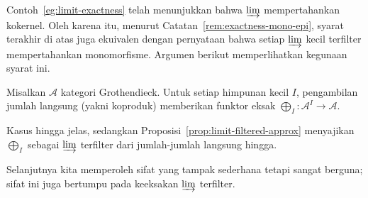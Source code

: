 Contoh~\ref{eg:limit-exactness} telah menunjukkan bahwa $\varinjlim$
mempertahankan kokernel. Oleh karena itu, menurut
Catatan~\ref{rem:exactness-mono-epi}, syarat terakhir di atas juga ekuivalen
dengan pernyataan bahwa setiap $\varinjlim$ kecil terfilter mempertahankan
monomorfisme. Argumen berikut memperlihatkan kegunaan syarat ini.

\begin{proposisi}\label{prop:Grothendieck-cat-coprod-exact}
Misalkan $\mathcal{A}$ kategori Grothendieck. Untuk setiap himpunan kecil $I$,
pengambilan jumlah langsung (yakni koproduk) memberikan funktor eksak
$\bigoplus_I:\mathcal{A}^I\to\mathcal{A}$.
\end{proposisi}
\begin{bukti}
Kasus hingga jelas, sedangkan Proposisi~\ref{prop:limit-filtered-approx}
menyajikan $\bigoplus_I$ sebagai $\varinjlim$ terfilter dari jumlah-jumlah
langsung hingga.
\end{bukti}

Selanjutnya kita memperoleh sifat yang tampak sederhana tetapi sangat berguna;
sifat ini juga bertumpu pada keeksakan $\varinjlim$ terfilter.

